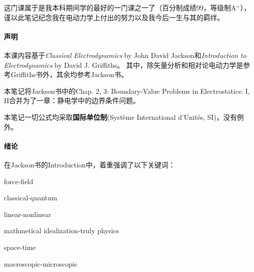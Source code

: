\preface

这门课属于是我本科期间学的最好的一门课之一了（百分制成绩99，等级制A$^+$），谨以此笔记纪念我在电动力学上付出的努力以及我今后一生与其的羁绊。

\paragraph{声明}
本课内容基于\textit{Classical Electrodynamics} by John David Jackson和\textit{Introduction to Electrodynamics} by David J. Griffiths。
其中，除矢量分析和相对论电动力学是参考Griffiths书外，其余均参考Jackson书。

本笔记将Jackson书中的Chap. 2, 3: Boundary-Value Problems in Electrostatics: I, II合并为了一章：静电学中的边界条件问题。

本笔记一切公式均采取\textbf{国际单位制}(Système International d'Unités, SI)，没有例外。

\paragraph{绪论}
在Jackson书的Introduction中，着重强调了以下关键词：
\begin{compactitem}
	\item force-field
	\item classical-quantum
	\item linear-nonlinear
	\item mathmetical idealization-truly physics
	\item space-time
	\item macroscopic-microscopic
\end{compactitem}